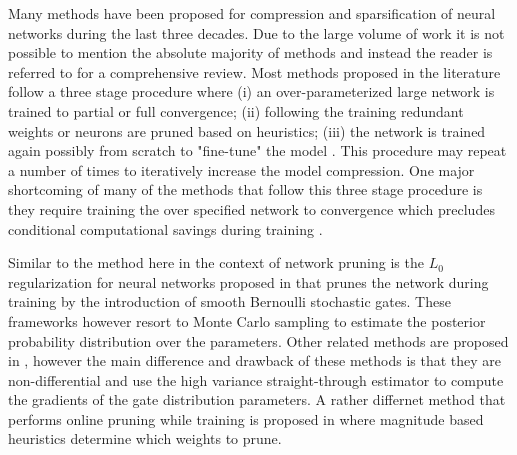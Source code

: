 \documentclass[final,1p,times]{elsarticle}
\begin{document}
Many methods have been proposed for compression and sparsification of neural networks during the last three decades. Due to the large volume of work it is not possible to mention the absolute majority of methods and instead the reader is referred to \cite{journals/corr/abs-1710-09282, DBLP:conf/mlsys/BlalockOFG20} for a comprehensive review. Most methods proposed in the literature follow a three stage procedure where (i) an over-parameterized large network is trained to partial or full convergence; (ii) following the training redundant weights or neurons are pruned based on heuristics; (iii) the network is trained again possibly from scratch to "fine-tune" the model \cite{liu2018rethinking,10.5555/2969239.2969366, DBLP:conf/iclr/MolchanovTKAK17, DBLP:conf/iccv/LuoWL17}. This procedure may repeat a number of times to iteratively increase the model compression. One major shortcoming of many of the methods that follow this three stage procedure is they require training the over specified network to convergence which precludes conditional computational savings during training \cite{liu2018rethinking, journals/corr/BengioLC13}.

Similar to the method here in the context of network pruning is the $L_0$ regularization for neural networks proposed in \cite{louizos2018learning, Huang_2020_CVPR_Workshops} that prunes the network during training by the introduction of smooth Bernoulli stochastic gates. These frameworks however resort to Monte Carlo sampling to estimate the posterior probability distribution over the parameters. Other related methods are proposed in \cite{srinivas2016training, srinivas2016generalized}, however the main difference and drawback of these methods is that they are non-differential and use the high variance straight-through estimator \cite{journals/corr/BengioLC13} to compute the gradients of the gate distribution parameters. A rather differnet method that performs online pruning while training is proposed in \cite{journals/corr/abs-1710-01878} where magnitude based heuristics determine which weights to prune.
\end{document}
